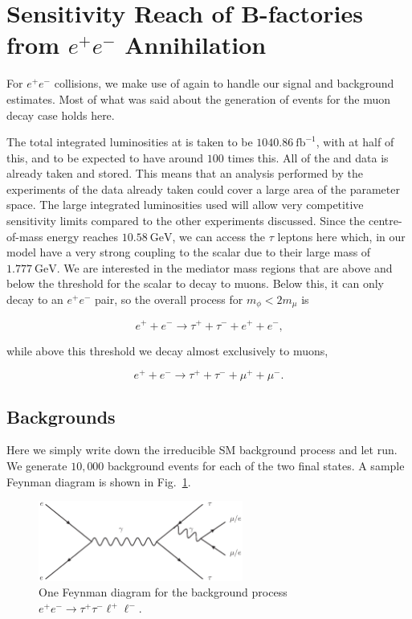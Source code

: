 \section{Sensitivity Reach of B-factories from $e^+ e^-$ Annihilation}
For $e^+ e^-$ collisions, we make use of \madgraph again to handle our signal and background estimates.
Most of what was said about the generation of events for the muon decay case holds here.

The total integrated luminosities at \belle is taken to be $1040.86~\textrm{fb}^{-1}$, with \babar at half of this, and \belletwo to be expected to have around $100$ times this.
All of the \babar and \belle data is already taken and stored.
This means that an analysis performed by the experiments of the data already taken could cover a large area of the parameter space.
The large integrated luminosities used will allow very competitive sensitivity limits compared to the other experiments discussed.
Since the centre-of-mass energy reaches $10.58~\textrm{GeV}$, we can access the $\tau$ leptons here which, in our model have a very strong coupling to the scalar due to their large mass of $1.777~\textrm{GeV}$.
We are interested in the mediator mass regions that are above and below the threshold for the scalar to decay to muons.
Below this, it can only decay to an $e^+ e^-$ pair, so the overall process for $m_\phi < 2m_\mu$ is

\begin{equation}
    e^+ + e^- \rightarrow \tau^+ + \tau^- + e^+ + e^-\textrm{,}
\end{equation}

\noindent while above this threshold we decay almost exclusively to muons,

\begin{equation}
    e^+ + e^- \rightarrow \tau^+ + \tau^- + \mu^+ + \mu^-\textrm{.}
\end{equation}

\subsection{Backgrounds}
Here we simply write down the irreducible SM background process and let \madgraph run.
We generate $10,000$ background events for each of the two final states.
A sample Feynman diagram is shown in Fig.~\ref{fig:ee_tautaull_SM}.

\begin{figure}[h]
    \centering
    \includegraphics[width=0.6\textwidth]{Figures/feynman_diagrams/ee_tautaull_SM}
    \caption{One Feynman diagram for the background process $e^+ e^- \rightarrow \tau^+ \tau^- \ell^+ \ell^-$.}
    \label{fig:ee_tautaull_SM}
\end{figure}


